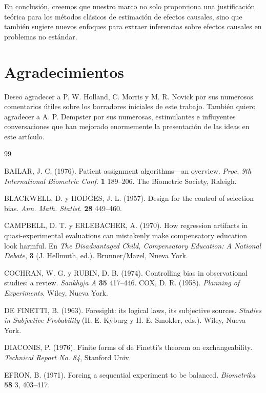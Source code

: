 \documentclass[12pt,a4paper]{article}
\begin{document}
{{En conclusión, creemos que nuestro marco no solo proporciona una justificación teórica para los métodos clásicos de estimación de efectos causales, sino que también sugiere nuevos enfoques para extraer inferencias sobre efectos causales en problemas no estándar. 

\section*{Agradecimientos}
Deseo agradecer a P. W. Holland, C. Morris y M. R. Novick por sus numerosos comentarios útiles sobre los borradores iniciales de este trabajo. También quiero agradecer a A. P. Dempster por sus numerosas, estimulantes e influyentes conversaciones que han mejorado enormemente la presentación de las ideas en este artículo.

\begin{thebibliography}{99}

BAILAR, J. C. (1976). Patient assignment algorithms---an overview. \textit{Proc. 9th International Biometric Conf.} \textbf{1} 189--206. The Biometric Society, Raleigh. 

BLACKWELL, D. y HODGES, J. L. (1957). Design for the control of selection bias. \textit{Ann. Math. Statist.} \textbf{28} 449--460. 

CAMPBELL, D. T. y ERLEBACHER, A. (1970). How regression artifacts in quasi-experimental evaluations can mistakenly make compensatory education look harmful. En \textit{The Disadvantaged Child, Compensatory Education: A National Debate}, \textbf{3} (J. Hellmuth, ed.). Brunner/Mazel, Nueva York.

COCHRAN, W. G. y RUBIN, D. B. (1974). Controlling bias in observational studies: a review. \textit{Sankhy\bar{a} A} \textbf{35} 417--446.  
COX, D. R. (1958). \textit{Planning of Experiments}. Wiley, Nueva York. 

DE FINETTI, B. (1963). Foresight: its logical laws, its subjective sources. \textit{Studies in Subjective Probability} (H. E. Kyburg y H. E. Smokler, eds.). Wiley, Nueva York. 

DIACONIS, P. (1976). Finite forms of de Finetti's theorem on exchangeability. \textit{Technical Report No. 84}, Stanford Univ. 

EFRON, B. (1971). Forcing a sequential experiment to be balanced. \textit{Biometrika} \textbf{58} 3, 403--417.


\end{thebibliography}}}
\end{document}

